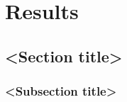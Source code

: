 \chapter{Results}
\lipsum[5]
\section{<Section title>}
\lipsum[6-10]
\subsection{<Subsection title>}
\lipsum[11-13]